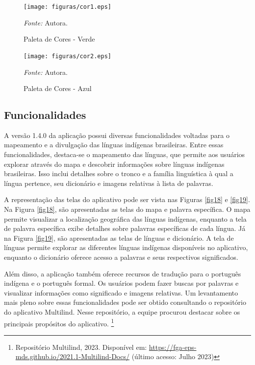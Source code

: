\begin{figure}[h!]
	\centering
	\caption{Paleta de Cores - Verde}
	\begin{adjustbox}{center}
		\texttt{[image: figuras/cor1.eps]}
	\end{adjustbox}
	\begin{tablenotes}[flushleft]
		\centering
		\item \textit{Fonte:} Autora.
	\end{tablenotes}
	\label{fig16}
\end{figure}

\begin{figure}[h!]
	\centering
	\caption{Paleta de Cores - Azul}
	\begin{adjustbox}{center}
		\texttt{[image: figuras/cor2.eps]}
	\end{adjustbox}
	\begin{tablenotes}[flushleft]
		\centering
		\item \textit{Fonte:} Autora.
	\end{tablenotes}
	\label{fig17}
\end{figure}

\subsection{Funcionalidades}
\label{Funcionalidades}
A versão 1.4.0 da aplicação possui diversas funcionalidades voltadas para o mapeamento e a divulgação das línguas indígenas brasileiras. Entre essas funcionalidades, destaca-se o mapeamento das línguas, que permite aos usuários 
explorar através do mapa e descobrir informações sobre línguas indígenas brasileiras. Isso inclui detalhes sobre o tronco e a família linguística à qual a língua pertence, seu dicionário e imagens relativas à lista de palavras.


A representação das telas do aplicativo pode ser vista nas Figuras \ref{fig18} e \ref{fig19}. Na Figura \ref{fig18}, são apresentadas as telas do mapa e palavra específica. O mapa permite visualizar a localização geográfica das 
línguas indígenas, enquanto a tela de palavra específica exibe detalhes sobre palavras específicas de cada língua. Já na Figura \ref{fig19}, são apresentadas as telas de línguas e dicionário. A tela de línguas permite explorar 
as diferentes línguas indígenas disponíveis no aplicativo, enquanto o dicionário oferece acesso a palavras e seus respectivos significados. 

Além disso, a aplicação também oferece recursos de tradução para o português indígena e o português formal. Os usuários podem fazer buscas por palavras e visualizar informações como significado e imagens relativas. Um levantamento 
mais pleno sobre essas funcionalidades pode ser obtido consultando o repositório do aplicativo Multilind. Nesse repositório, a equipe procurou destacar sobre os principais propósitos do aplicativo. \footnote{Repositório Multilind, 2023. Disponível
em: \url{https://fga-eps-mds.github.io/2021.1-Multilind-Docs/} (último acesso: Julho 2023)}

